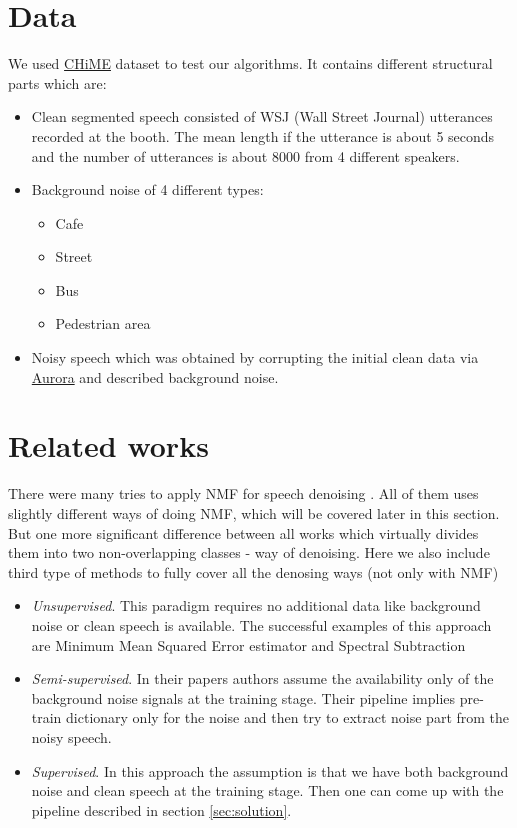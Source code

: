 \documentclass[11pt]{article}
\begin{document}
\section{Data}

We used \href{http://spandh.dcs.shef.ac.uk/chime_challenge/chime_download.html}{CHiME} dataset to test our algorithms. It contains different structural parts which are:
\begin{itemize}
  \item Clean segmented speech consisted of WSJ (Wall Street Journal) utterances recorded at the booth. The mean length if the utterance is about 5 seconds and the number of utterances is about 8000 from 4 different speakers.
  \item Background noise of 4 different types:
    \begin{itemize}
        \item Cafe
        \item Street
        \item Bus
        \item Pedestrian area
    \end{itemize}
  \item Noisy speech which was obtained by corrupting the initial clean data via \href{http://aurora.hsnr.de/download.html}{Aurora} and described background noise.
\end{itemize}

\section{Related works}

There were many tries to apply NMF for speech denoising \cite{cauchi, lyubimov, smaragdis, wilson, vaz}. All of them uses slightly different ways of doing NMF, which will be covered later in this section. But one more significant difference between all works which virtually divides them into two non-overlapping classes - way of denoising. Here we also include third type of methods to fully cover all the denosing ways (not only with NMF)
\begin{itemize}
\item \textit{Unsupervised}. This paradigm requires no additional data like background noise or clean speech is available. The successful examples of this approach are Minimum Mean Squared Error estimator \cite{ephraim} and Spectral Subtraction \cite{boll}
\item \textit{Semi-supervised}. In their papers \cite{cauchi, lyubimov} authors assume the availability only of the background noise signals at the training stage. Their pipeline implies pre-train dictionary only for the noise and then try to extract noise part from the noisy speech.
\item \textit{Supervised}. In this approach \cite{wilson, vaz} the assumption is that we have both background noise and clean speech at the training stage. Then one can come up with the pipeline described in section \ref{sec:solution}.
\end{itemize}
\end{document}
